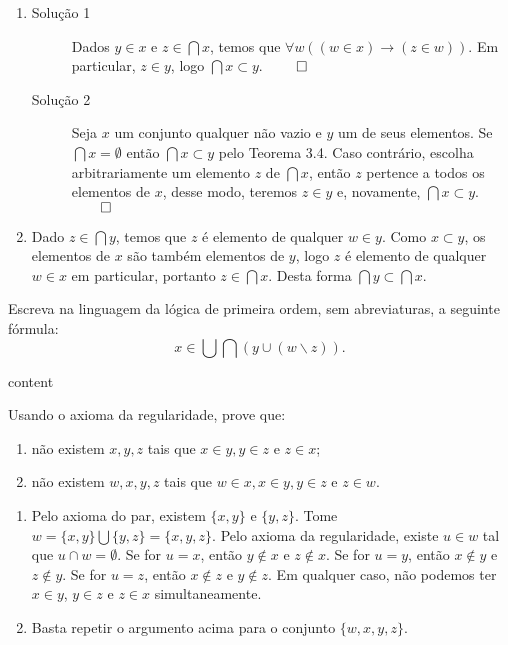 \begin{enumerate}[label=(\alph{*})]
	\item
		\begin{description}
			\item[Solução 1] Dados $y\in x$ e $z\in\bigcap x$, temos que $\forall w((w\in x)\to(z\in w))$. Em particular, $z\in y$, logo $\bigcap x\subset y$. $\qed$
			\item[Solução 2] Seja $x$ um conjunto qualquer não vazio e $y$ um de seus elementos. Se $\bigcap x = \emptyset$ então $\bigcap x \subset y$ pelo Teorema 3.4. Caso contrário, escolha arbitrariamente um elemento $z$ de $\bigcap x$, então $z$ pertence a todos os elementos de $x$, desse modo, teremos $z \in y$ e, novamente, $\bigcap x \subset y$. $\qed$
		\end{description}
	\item Dado $z\in\bigcap y$, temos que $z$ é elemento de qualquer $w\in y$. Como $x\subset y$, os elementos de $x$ são também elementos de  $y$, logo $z$ é elemento de qualquer $w\in x$ em particular, portanto $z\in\bigcap x$. Desta forma $\bigcap y\subset\bigcap x$.
\end{enumerate}


\begin{exercicio}
	Escreva na linguagem da lógica de primeira ordem, sem abreviaturas, a seguinte fórmula:
	$$x\in\bigcup\bigcap(y\cup(w\backslash z)).$$
\end{exercicio}
\begin{solucao}
	content
\end{solucao}

\begin{exercicio}
	Usando o axioma da regularidade, prove que:
	\begin{enumerate}[label=(\alph{*})]
		\item não existem $x,y,z$ tais que $x\in y,y\in z$ e $z\in x$;
		\item não existem $w,x,y,z$ tais que $w\in x,x\in y,y\in z$ e $z\in w$.
	\end{enumerate}
\end{exercicio}
\begin{solucao}
	\begin{enumerate}[label=(\alph{*})]
		\item Pelo axioma do par, existem $\{x,y\}$ e $\{y,z\}$. Tome $w=\{x,y\}\bigcup \{y,z\}=\{x,y,z\}$. Pelo axioma da regularidade, existe $u\in w$ tal que $u\cap w=\emptyset$. Se for $u=x$, então $y\notin x$ e $z\notin x$. Se for $u=y$, então $x\notin y$ e $z\notin y$. Se for $u=z$, então $x\notin z$ e $y\notin z$. Em qualquer caso, não podemos ter $x\in y$, $y\in z$ e $z\in x$ simultaneamente.
		\item Basta repetir o argumento acima para o conjunto $\{w,x,y,z\}$.
	\end{enumerate}
\end{solucao}

